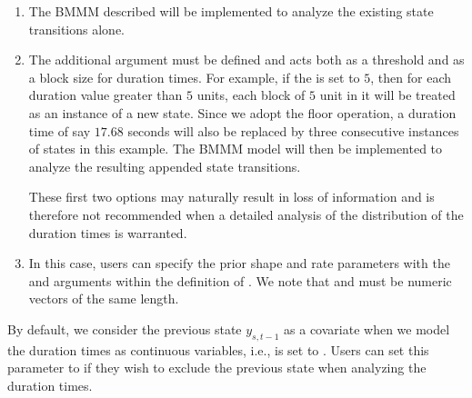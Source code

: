 \begin{enumerate}
\item {} 
The BMMM described will be implemented to analyze the existing state transitions alone. 

\item {}
The additional argument  must be defined and acts both as a threshold and as a block size for {duration times}. 
For example, if the  is set to $5$, then for each {duration} value greater than $5$ units, each block of $5$ unit in it will be treated as an instance of a new  state. 
{Since we adopt the floor operation,  a {duration time} of say $17.68$ seconds will also be replaced by three consecutive instances of  states in this example.}  
The BMMM model  will then be implemented to analyze the resulting appended state transitions. 


These first two options may naturally result in loss of information and is therefore not recommended when a detailed analysis of the distribution of the {duration times} is warranted. 

\item {} 
In this case,  users can specify the prior shape and rate parameters with the  and   arguments within the definition of . 
We note that  and   must be numeric vectors of the same length. 
\end{enumerate}

By default, we consider the previous state $y_{s,t-1}$ as a covariate when we model the {duration times} as continuous variables, i.e.,   is set to . 
Users can set this parameter to  if they wish to exclude the previous state when analyzing the {duration times}.







